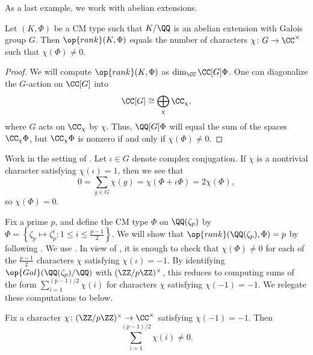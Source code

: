 \documentclass{article}
\begin{document}
As a last example, we work with abelian extensions.
\begin{lemma} \label{lem:rank-cm-type-character}
	Let $(K,\Phi)$ be a CM type such that $K/\QQ$ is an abelian extension with Galois group $G$. Then $\op{rank}(K,\Phi)$ equals the number of characters $\chi\colon G\to\CC^\times$ such that $\chi(\Phi)\ne0$.
\end{lemma}
\begin{proof}
	We will compute $\op{rank}(K,\Phi)$ as $\dim_\CC\CC[G]\Phi$. One can diagonalize the $G$-action on $\CC[G]$ into
	\[\CC[G]\cong\bigoplus_\chi\CC_\chi,\]
	where $G$ acts on $\CC_\chi$ by $\chi$. Thus, $\QQ[G]\Phi$ will equal the sum of the spaces $\CC_\chi\Phi$, but $\CC_\chi\Phi$ is nonzero if and only if $\chi(\Phi)\ne0$.
\end{proof}
\begin{remark} \label{rem:rank-cm-even-character}
	Work in the setting of . Let $\iota\in G$ denote complex conjugation. If $\chi$ is a nontrivial character satisfying $\chi(\iota)=1$, then we see that
	\[0=\sum_{g\in G}\chi(g)=\chi(\Phi+\iota\Phi)=2\chi(\Phi),\]
	so $\chi(\Phi)=0$.
\end{remark}
\begin{example} \label{ex:p-cyclo-cm-rank}
	Fix a prime $p$, and define the CM type $\Phi$ on $\QQ(\zeta_p)$ by $\Phi=\left\{\zeta_p\mapsto\zeta_p^i:1\le i\le\frac{p-1}2\right\}$. We will show that $\op{rank}(\QQ(\zeta_p),\Phi)=p$ by following \cite[Section~4]{kubota-cm-type}. We use . In view of , it is enough to check that $\chi(\Phi)\ne0$ for each of the $\frac{p-1}2$ characters $\chi$ satisfying $\chi(\iota)=-1$. By identifying $\op{Gal}(\QQ(\zeta_p)/\QQ)$ with $(\ZZ/p\ZZ)^\times$, this reduces to computing sums of the form $\sum_{i=1}^{(p-1)/2}\chi(i)$ for characters $\chi$ satisfying $\chi(-1)=-1$. We relegate these computations to  below.
\end{example}
\begin{lemma} \label{lem:class-number-formula-chi}
	Fix a character $\chi\colon(\ZZ/p\ZZ)^\times\to\CC^\times$ satisfying $\chi(-1)=-1$. Then
	\[\sum_{i=1}^{(p-1)/2}\chi(i)\ne0.\]
\end{lemma}
\end{document}
